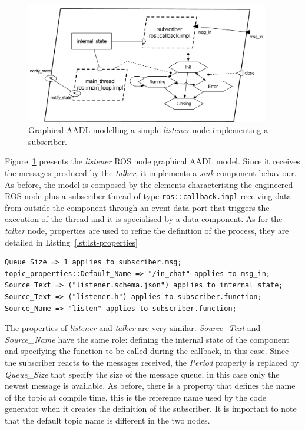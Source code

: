 \begin{figure}[t]
\centering
\includegraphics[width=0.95\textwidth]{gfx/usecase-subscriber}
\caption{Graphical AADL modelling a simple \textit{listener} node implementing a subscriber.}\label{fig:usecase-subscriber}
\end{figure}

Figure~\ref{fig:usecase-subscriber} presents the \textit{listener} ROS node graphical AADL model. Since it receives the messages produced by the \textit{talker}, it implements a \textit{sink} component behaviour. As before, the model is composed by the elements characterising the engineered ROS node plus a subscriber thread of type \texttt{ros::callback.impl} receiving data from outside the component through an event data port that triggers the execution of the thread and it is specialised by a data component. As for the \textit{talker} node, properties are used to refine the definition of the process, they are detailed in Listing~\ref{lst:lst-properties}

\begin{lstlisting}[language=AADL,caption={Properties of the listener node.},label=lst:lst-properties]
Queue_Size => 1 applies to subscriber.msg;
topic_properties::Default_Name => "/in_chat" applies to msg_in;
Source_Text => ("listener.schema.json") applies to internal_state;
Source_Text => ("listener.h") applies to subscriber.function;
Source_Name => "listen" applies to subscriber.function;
\end{lstlisting}

The properties of \textit{listener} and \textit{talker} are very similar. \textit{Source\_Text} and \textit{Source\_Name} have the same role: defining the internal state of the component and specifying the function to be called during the callback, in this case. Since the subscriber reacts to the messages received, the \textit{Period} property is replaced by \textit{Queue\_Size} that specify the size of the message queue, in this case only the newest message is available. As before, there is a property that defines the name of the topic at compile time, this is the reference name used by the code generator when it creates the definition of the subscriber. It is important to note that the default topic name is different in the two nodes.

